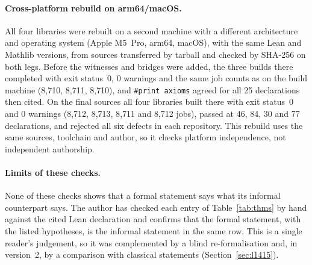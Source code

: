 \documentclass[11pt]{article}
\theoremstyle{definition}
\theoremstyle{remark}
\newcommand{\lean}[1]{\texttt{#1}}
\begin{document}
\paragraph{Cross-platform rebuild on arm64/macOS.} All four libraries
were rebuilt on a second machine with a different architecture and operating system (Apple
M5~Pro, arm64, macOS), with the same Lean and Mathlib versions, from sources transferred by
tarball and checked by SHA-256 on both legs. Before the witnesses and bridges were added, the
three builds there completed with exit status~0, 0 warnings and the same job counts as on the
build machine (8{,}710, 8{,}711, 8{,}710), and \lean{\#print axioms} agreed for all 25
declarations then cited. On the final sources all four libraries built there with exit status~0
and 0 warnings (8{,}712, 8{,}713, 8{,}711 and 8{,}712 jobs),  passed at 46, 84, 30
and 77 declarations, and  rejected all six defects in each repository. This
rebuild uses the same sources, toolchain and author, so it checks platform independence, not
independent authorship.

\paragraph{Limits of these checks.} None of these checks shows that a formal statement says what
its informal counterpart says. The author has checked each entry of Table~\ref{tab:thms} by hand
against the cited Lean declaration and confirms that the formal statement, with the listed
hypotheses, is the informal statement in the same row. This is a single reader's judgement, so it
was complemented by a blind re-formalisation and, in version~2, by a comparison with classical
statements (Section~\ref{sec:l1415}).
\end{document}
